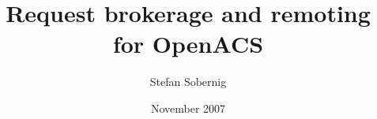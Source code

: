 
  
\title{Request brokerage and remoting for OpenACS}
\author{Stefan Sobernig}
\date{November 2007}
\maketitle
\renewcommand{\contentsname}{}
\tableofcontents 

%
%


%



 \newpage
 
 \newpage
    